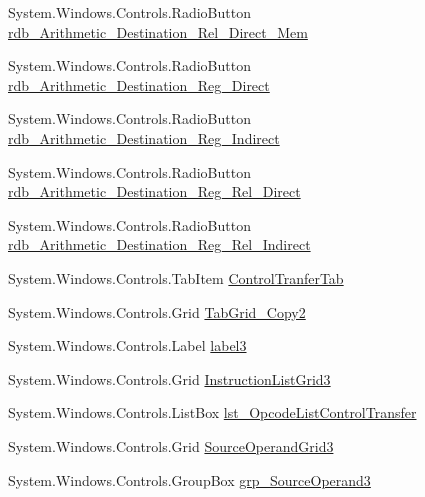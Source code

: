 \begin{DoxyCompactItemize}
System.\+Windows.\+Controls.\+Radio\+Button \hyperlink{class_c_p_u___o_s___simulator_1_1_instructions_window_ab1611c3f7ab9834ae5aba9d573d0b9d3}{rdb\+\_\+\+Arithmetic\+\_\+\+Destination\+\_\+\+Rel\+\_\+\+Direct\+\_\+\+Mem}
\item 
System.\+Windows.\+Controls.\+Radio\+Button \hyperlink{class_c_p_u___o_s___simulator_1_1_instructions_window_ab0842246596273553e3c2c96e64e4d87}{rdb\+\_\+\+Arithmetic\+\_\+\+Destination\+\_\+\+Reg\+\_\+\+Direct}
\item 
System.\+Windows.\+Controls.\+Radio\+Button \hyperlink{class_c_p_u___o_s___simulator_1_1_instructions_window_a93d71a6a10a51a86818ca603c17a0580}{rdb\+\_\+\+Arithmetic\+\_\+\+Destination\+\_\+\+Reg\+\_\+\+Indirect}
\item 
System.\+Windows.\+Controls.\+Radio\+Button \hyperlink{class_c_p_u___o_s___simulator_1_1_instructions_window_a022d5ebc6316ac46534ff28dbd549f03}{rdb\+\_\+\+Arithmetic\+\_\+\+Destination\+\_\+\+Reg\+\_\+\+Rel\+\_\+\+Direct}
\item 
System.\+Windows.\+Controls.\+Radio\+Button \hyperlink{class_c_p_u___o_s___simulator_1_1_instructions_window_af50815befd9b7e05e5703e8461c71bc7}{rdb\+\_\+\+Arithmetic\+\_\+\+Destination\+\_\+\+Reg\+\_\+\+Rel\+\_\+\+Indirect}
\item 
System.\+Windows.\+Controls.\+Tab\+Item \hyperlink{class_c_p_u___o_s___simulator_1_1_instructions_window_a52cb165b57f01928c088b3052de70b5b}{Control\+Tranfer\+Tab}
\item 
System.\+Windows.\+Controls.\+Grid \hyperlink{class_c_p_u___o_s___simulator_1_1_instructions_window_ac4b83982bf62dc5c0484ac2729167ba4}{Tab\+Grid\+\_\+\+Copy2}
\item 
System.\+Windows.\+Controls.\+Label \hyperlink{class_c_p_u___o_s___simulator_1_1_instructions_window_a394b28c312ae1a83128da41990fc5d32}{label3}
\item 
System.\+Windows.\+Controls.\+Grid \hyperlink{class_c_p_u___o_s___simulator_1_1_instructions_window_a3cc76cf3ae5c4155d0e30727eb357d12}{Instruction\+List\+Grid3}
\item 
System.\+Windows.\+Controls.\+List\+Box \hyperlink{class_c_p_u___o_s___simulator_1_1_instructions_window_a111f1ddd903fe40e0c83efeca42bdf51}{lst\+\_\+\+Opcode\+List\+Control\+Transfer}
\item 
System.\+Windows.\+Controls.\+Grid \hyperlink{class_c_p_u___o_s___simulator_1_1_instructions_window_ab8409532df6419d7f7ce0c3450807906}{Source\+Operand\+Grid3}
\item 
System.\+Windows.\+Controls.\+Group\+Box \hyperlink{class_c_p_u___o_s___simulator_1_1_instructions_window_a59e5e9da77976ce8f2d8a43528b98f63}{grp\+\_\+\+Source\+Operand3}

\end{DoxyCompactItemize}
